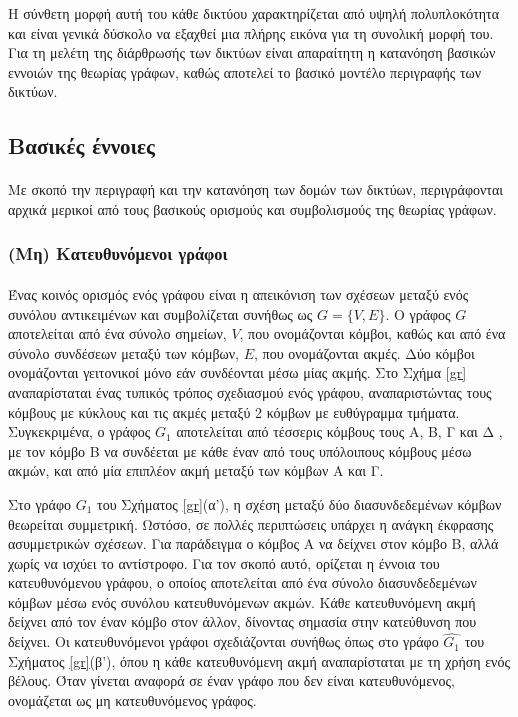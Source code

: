 \documentclass[12pt,twoside]{article}
\newcommand{\gr}{\selectlanguage{greek}}
\begin{document}
Η σύνθετη μορφή αυτή του κάθε δικτύου χαρακτηρίζεται από υψηλή πολυπλοκότητα και είναι γενικά δύσκολο να εξαχθεί μια πλήρης εικόνα για τη συνολική μορφή του. Για τη μελέτη της διάρθρωσής των δικτύων είναι απαραίτητη η κατανόηση βασικών εννοιών της θεωρίας γράφων, καθώς αποτελεί το βασικό μοντέλο περιγραφής των δικτύων.  



\subsection{\gr Βασικές έννοιες}
\paragraph{}\gr
Με σκοπό την περιγραφή και την κατανόηση των δομών των δικτύων, περιγράφονται αρχικά μερικοί από τους βασικούς ορισμούς και συμβολισμούς της θεωρίας γράφων. 

\subsubsection{\gr (Μη) Κατευθυνόμενοι γράφοι}
\paragraph{}\gr
Ένας κοινός ορισμός ενός γράφου είναι η απεικόνιση των σχέσεων μεταξύ ενός συνόλου αντικειμένων και συμβολίζεται συνήθως ως $G=\{V, E\}$. Ο γράφος $G$ αποτελείται από ένα σύνολο σημείων, $V$, που ονομάζονται κόμβοι, καθώς και από ένα σύνολο συνδέσεων μεταξύ των κόμβων, $E$, που ονομάζονται ακμές. Δύο κόμβοι ονομάζονται γειτονικοί μόνο εάν συνδέονται μέσω μίας ακμής. Στο Σχήμα \ref{gr} αναπαρίσταται ένας τυπικός τρόπος σχεδιασμού ενός γράφου, αναπαριστώντας τους κόμβους με κύκλους και τις ακμές μεταξύ 2 κόμβων με ευθύγραμμα τμήματα. Συγκεκριμένα, ο γράφος $G_1$ αποτελείται από τέσσερις κόμβους τους Α, Β, Γ και Δ , με τον κόμβο Β να συνδέεται με κάθε έναν από τους υπόλοιπους κόμβους μέσω ακμών, και από μία επιπλέον ακμή μεταξύ των κόμβων Α και Γ. 

Στο γράφο $G_1$ του Σχήματος \ref{gr}(α'), η σχέση μεταξύ δύο διασυνδεδεμένων κόμβων θεωρείται συμμετρική. Ωστόσο, σε πολλές περιπτώσεις υπάρχει η ανάγκη έκφρασης ασυμμετρικών σχέσεων. Για παράδειγμα ο κόμβος Α να δείχνει στον κόμβο Β, αλλά χωρίς να ισχύει το αντίστροφο. Για τον σκοπό αυτό, ορίζεται η έννοια του κατευθυνόμενου γράφου, ο οποίος αποτελείται από ένα σύνολο διασυνδεδεμένων κόμβων μέσω ενός συνόλου κατευθυνόμενων ακμών. Κάθε κατευθυνόμενη ακμή δείχνει από τον έναν κόμβο στον άλλον, δίνοντας σημασία στην κατεύθυνση που δείχνει.  Οι κατευθυνόμενοι γράφοι σχεδιάζονται συνήθως όπως στο γράφο $\hat{G_1}$ του Σχήματος \ref{gr}(β'), όπου η κάθε κατευθυνόμενη ακμή αναπαρίσταται με τη χρήση ενός βέλους. Όταν γίνεται αναφορά σε έναν γράφο που δεν είναι κατευθυνόμενος, ονομάζεται ως μη κατευθυνόμενος γράφος. 
\end{document}
